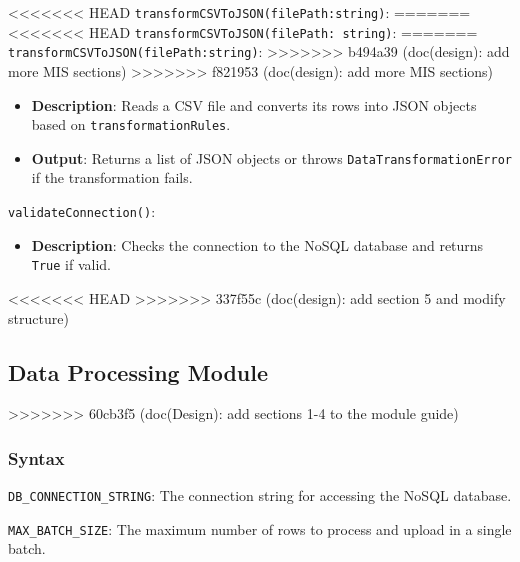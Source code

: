 \documentclass[12pt, titlepage]{article}
\begin{document}
\begin{description}
\begin{description}
  \item[Local Function:] 
  \item
<<<<<<< HEAD
  \texttt{transformCSVToJSON(filePath:string)}:
=======
<<<<<<< HEAD
  \texttt{transformCSVToJSON(filePath: string)}:
=======
  \texttt{transformCSVToJSON(filePath:string)}:
>>>>>>> b494a39 (doc(design): add more MIS sections)
>>>>>>> f821953 (doc(design): add more MIS sections)
  \item
  \begin{itemize}
    \item \textbf{Description}: Reads a CSV file and converts its rows into JSON objects based on
    \texttt{transformationRules}.
  \end{itemize}
  \item 
  \begin{itemize}
    \item \textbf{Output}: Returns a list of JSON objects or throws \texttt{DataTransformationError}
    if the transformation fails.
  \end{itemize}
  \item 
  \texttt{validateConnection()}:
  \item 
  \begin{itemize}
    \item \textbf{Description}: Checks the connection to the NoSQL database and returns \texttt{True}
    if valid.
  \end{itemize}
\end{description}

<<<<<<< HEAD
>>>>>>> 337f55c (doc(design): add section 5 and modify structure)
\subsection{Data Processing Module}
>>>>>>> 60cb3f5 (doc(Design): add sections 1-4 to the module guide)

\subsubsection{Syntax}
\begin{description}
  \item[Exported Constants and Access Programs:]
  \item 
  \texttt{DB\_CONNECTION\_STRING}: The connection string for accessing the
    NoSQL database.
  \item
  \texttt{MAX\_BATCH\_SIZE}: The maximum number of rows to process and upload
  in a single batch.


\end{description}
\end{description}
\end{document}
